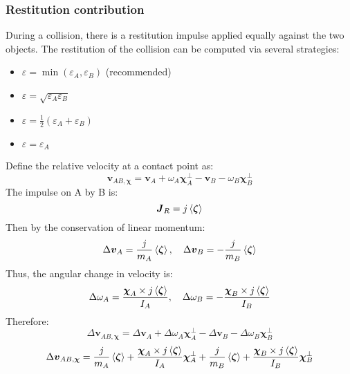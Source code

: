 \documentclass[10pt]{report}
\begin{document}
\subsubsection{Restitution contribution}
During a collision, there is a restitution impulse applied equally against the two objects. The restitution of the collision can be computed via several strategies:
\begin{itemize}
\item $\varepsilon=\min(\varepsilon_A,\varepsilon_B)$ (recommended)
\item $\varepsilon=\sqrt{\varepsilon_A\varepsilon_B}$
\item $\varepsilon=\frac{1}{2}(\varepsilon_A+\varepsilon_B)$
\item $\varepsilon=\varepsilon_A$
\end{itemize}
Define the relative velocity at a contact point as:
\begin{equation}\boldsymbol{v}_{AB,\boldsymbol{\chi}}=\boldsymbol{v}_A+\omega_A\boldsymbol{\chi}_A^\perp-\boldsymbol{v}_B-\omega_B\boldsymbol{\chi}_B^\perp\end{equation}
The impulse on A by B is:
\begin{equation}\boldsymbol{J}_R=j\braket{\boldsymbol{\zeta}}\end{equation}
Then by the conservation of linear momentum:
\begin{equation}\Delta\boldsymbol{v}_A=\frac{j}{m_A}\braket{\boldsymbol{\zeta}},\quad\Delta\boldsymbol{v}_B=-\frac{j}{m_B}\braket{\boldsymbol{\zeta}}\end{equation}
Thus, the angular change in velocity is:
\begin{equation}\Delta\omega_A=\frac{\boldsymbol{\chi}_A\times j\braket{\boldsymbol{\zeta}}}{I_A},\quad\Delta\omega_B=-\frac{\boldsymbol{\chi}_B\times j\braket{\boldsymbol{\zeta}}}{I_B}\end{equation}
Therefore:
\begin{equation}\Delta\boldsymbol{v}_{AB,\boldsymbol{\chi}}=\Delta\boldsymbol{v}_A+\Delta\omega_A\boldsymbol{\chi}_A^\perp-\Delta\boldsymbol{v}_B-\Delta\omega_B\boldsymbol{\chi}_B^\perp\end{equation}
\begin{equation}\Delta\boldsymbol{v}_{AB,\boldsymbol{\chi}}=\frac{j}{m_A}\braket{\boldsymbol{\zeta}}+\frac{\boldsymbol{\chi}_A\times j\braket{\boldsymbol{\zeta}}}{I_A}\boldsymbol{\chi}_A^\perp+\frac{j}{m_B}\braket{\boldsymbol{\zeta}}+\frac{\boldsymbol{\chi}_B\times j\braket{\boldsymbol{\zeta}}}{I_B}\boldsymbol{\chi}_B^\perp\end{equation}
\end{document}
